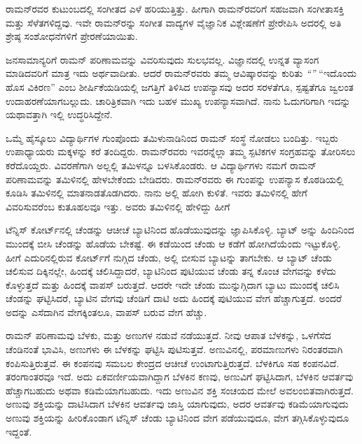 ರಾಮನ್‍ರವರ ಕುಟುಂಬದಲ್ಲಿ ಸಂಗೀತದ ಎಳೆ ಹರಿಯುತ್ತಿತ್ತು. ಹೀಗಾಗಿ ರಾಮನ್‍ರವರಿಗೆ ಸಹಜವಾಗಿ ಸಂಗೀತಾಸಕ್ತಿ ಮತ್ತು ಸೆಳೆತಗಳಿದ್ದವು. ಇವೇ ರಾಮನ್‍ರನ್ನು ಸಂಗೀತ ವಾದ್ಯಗಳ ವೈಜ್ಞಾನಿಕ ವಿಶ್ಲೇಷಣೆಗೆ ಪ್ರೇರೇಪಿಸಿ ಅದರಲ್ಲಿ ಅತಿ ಶ್ರೇಷ್ಠ ಸಂಶೋಧನೆಗಳಿಗೆ ಪ್ರೇರಣೆಯಾಯಿತು.



ಜನಸಾಮಾನ್ಯರಿಗೆ ರಾಮನ್ ಪರಿಣಾಮವನ್ನು ವಿವರಿಸುವುದು ಸುಲಭವಲ್ಲ. ವಿಜ್ಞಾನದಲ್ಲಿ ಉನ್ನತ ವ್ಯಾಸಂಗ ಮಾಡಿದವರಿಗೆ ಮಾತ್ರ ಇದು ಅರ್ಥವಾದೀತು. ಆದರೆ ರಾಮನ್‍ರವರು ತಮ್ಮ ಆವಿಷ್ಕಾರವನ್ನು ಕುರಿತು \textit{“”} “ಇದೊಂದು ಹೊಸ ವಿಕಿರಣ” ಎಂಬ ಶೀರ್ಷಿಕೆಯಡಿಯಲ್ಲಿ ಜಗತ್ತಿಗೆ ತಿಳಿಸಿದ ಉಪನ್ಯಾಸವು ಅದರ ಸರಳತೆಗೂ, ಸ್ಪಷ್ಟತೆಗೂ ಜ್ವಲಂತ ಉದಾಹರಣೆಯಾಗಬಲ್ಲುದು. ಚಾರಿತ್ರಿಕವಾಗಿ ಇದು ಬಹಳ ಮುಖ್ಯ ಉಪನ್ಯಾಸವಾಗಿದೆ. ನಾನು ಓದುಗರಿಗಾಗಿ ಇದನ್ನು ಯಥಾವತ್ತಾಗಿ ಇಲ್ಲಿ ಉದ್ಧರಿಸಿದ್ದೇನೆ.

ಒಮ್ಮೆ ಹೈಸ್ಕೂಲು ವಿದ್ಯಾರ್ಥಿಗಳ ಗುಂಪೊಂದು ತಮಿಳುನಾಡಿನಿಂದ ರಾಮನ್ ಸಂಸ್ಥೆ ನೋಡಲು ಬಂದಿತ್ತು. ಇಬ್ಬರು ಉಪಾಧ್ಯಾಯರು  ಮಕ್ಕಳನ್ನು ಕರೆ ತಂದಿದ್ದರು. ರಾಮನ್‍ರವರು ಇವರನ್ನೆಲ್ಲಾ ತಮ್ಮ ಸ್ಪಟಿಕಗಳ ಸಂಗ್ರಹವನ್ನು ತೋರಿಸಲು ಕರೆದೊಯ್ದರು. ವಿವರಣೆಗಾಗಿ ಅಲ್ಲಲ್ಲಿ ತಮಿಳನ್ನೂ ಬಳಸಿಕೊಂಡರು. ಆ ವಿದ್ಯಾರ್ಥಿಗಳು ನಮಗೆ ರಾಮನ್ ಪರಿಣಾಮವನ್ನು ತಮಿಳಿನಲ್ಲಿ ಹೇಳಬೇಕೆಂದು ಬೇಡಿದರು. ರಾಮನ್‍ರವರು ಈ ಗುಂಪನ್ನು ಉಪನ್ಯಾಸ ಕೊಠಡಿಯಲ್ಲಿ ಕೂಡಿಸಿ ತಮಿಳಿನಲ್ಲಿ ಮಾತನಾಡತೊಡಗಿದರು. ನಾನು ಅಲ್ಲಿ ಹೋಗಿ ಕುಳಿತೆ. ಇವರು ತಮಿಳಿನಲ್ಲಿ ಹೇಗೆ ವಿವರಿಸುವರೆಂಬ ಕುತೂಹಲವೂ ಇತ್ತು. ಅವರು ತಮಿಳಿನಲ್ಲಿ ಹೇಳಿದ್ದು ಹೀಗೆ

\enginline{-}ಟೆನ್ನಿಸ್ ಕೋರ್ಟ್‌ನಲ್ಲಿ ಚೆಂಡನ್ನು ಆಚೀಚೆ ಬ್ಯಾಟಿನಿಂದ ಹೊಡೆಯುವುದನ್ನು ಜ್ಞಾಪಿಸಿಕೊಳ್ಳಿ. ಬ್ಯಾಟ್ ಅನ್ನು ಹಿಂದಿನಿಂದ ಮುಂದಕ್ಕೆ ಬೀಸಿ ಚೆಂಡನ್ನು ಹೊಡೆಯ ಬೇಕಷ್ಟೆ. ಈ ಕಡೆಯಿಂದ ಚೆಂಡು ಆ ಕಡೆಗೆ ಹೋಗಿದೆಯೆಂದು ಇಟ್ಟುಕೊಳ್ಳಿ. ಹೀಗೆ ಎದುರಿನಲ್ಲಿರುವ ಕೋರ್ಟ್‌ಗೆ ನುಗ್ಗಿದ ಚೆಂಡು, ಅಲ್ಲಿ ಬೀಸುವ ಬ್ಯಾಟನ್ನು ತಾಗಬೇಕು. ಆ ಬ್ಯಾಟ್ ಚೆಂಡು ಚಲಿಸುವ ದಿಕ್ಕಿನಲ್ಲೇ, ಹಿಂದಕ್ಕೆ ಚಲಿಸಿದ್ದಾದರೆ, ಬ್ಯಾಟಿನಿಂದ ಪುಟಿಯುವ ಚೆಂಡು ತನ್ನ ಕೊಂಚ ವೇಗವನ್ನು ಕಳೆದು ಕೊಳ್ಳುತ್ತದೆ ಮತ್ತು ಹಿಂದಕ್ಕೆ ವಾಪಸ್ ಬರುತ್ತದೆ. ಆದರೇ ಇದೇ ಚೆಂಡು ಮುನ್ನುಗ್ಗಿದಾಗ ಬ್ಯಾಟು ಮುಂದಕ್ಕೆ ಚಲಿಸಿ ಚೆಂಡನ್ನು ಘಟ್ಟಿಸಿದರೆ, ಬ್ಯಾಟಿನ ವೇಗವು ಚೆಂಡಿಗೆ ದಾಟಿ ಅದು ಹಿಂದಕ್ಕೆ ಪುಟಿಯುವ ವೇಗ ಹೆಚ್ಚಾಗುತ್ತದೆ. ಅಂದರೆ ಅದನ್ನು ಎಸೆದಾಗಿನ ವೇಗಕ್ಕಿಂತಲೂ, ವಾಪಸ್ ಬರುವ ವೇಗ ಹೆಚ್ಚು.

ರಾಮನ್ ಪರಿಣಾಮವು ಬೆಳಕು, ಮತ್ತು ಅಣುಗಳ ನಡುವೆ ನಡೆಯುತ್ತದೆ. ನೀವು ಆಪಾತ ಬೆಳಕನ್ನು, ಒಳಗೆಸೆದ ಚೆಂಡಿನಂತೆ ಭಾವಿಸಿ, ಅಣುಗಳು ಈ ಬೆಳಕನ್ನು ಘಟ್ಟಿಸಿ ಪುಟಿಸುತ್ತವೆ. ಅಣುವಿನಲ್ಲಿ, ಪರಮಾಣುಗಳು ನಿರಂತರವಾಗಿ ಕಂಪಿಸುತ್ತಿರುತ್ತವೆ. ಈ ಕಂಪನವು ಸಮಬಲ ಕೇಂದ್ರದ ಆಚೀಚೆ ಉಂಟಾಗುತ್ತಿರುತ್ತದೆ. ಬೆಳಕಿಗೂ ಸಹ ಕಂಪನವಿದೆ. ತರಂಗಾಂತರವೂ ಇದೆ. ಅದು ಏಕವರ್ಣೀಯವಾಗಿದ್ದಾಗ ಬೆಳಕಿನ ಕಣವು, ಅಣುವಿಗೆ ಘಟ್ಟಿಸಿದಾಗ, ಬೆಳಕಿನ ಆವರ್ತವು ಹೆಚ್ಚಾಗಬಹುದು ಅಥವಾ ಕಡಿಮೆಯಾಗಬಹುದು. ಇದು ಅಣುವಿನ ಶಕ್ತಿ ಸಂಚಯದ ಮೇಲೆ ಅವಲಂಬಿತವಾಗಿರುತ್ತದೆ. ಅಣುವು ಶಕ್ತಿಯನ್ನು ದಾಟಿಸಿದಾಗ ಬೆಳಕಿನ ಆವರ್ತವು ಜಾಸ್ತಿ ಯಾಗುವುದು, ಅದರ ಆವರ್ತವು ಕಡಿಮೆಯಾಗುವುದು  ಅಣುವು ಶಕ್ತಿಯನ್ನು ಹೀರಿಕೊಂಡಾಗ ಟೆನ್ನಿಸ್ ಚೆಂಡು ಬ್ಯಾಟಿನಿಂದ ವೇಗ ಪಡೆಯುವುದೂ, ವೇಗ ತಗ್ಗಿಸಿಕೊಳ್ಳುವುದೂ ಇದ್ದಂತೆ.


